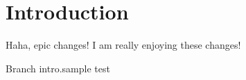 \chapter{Introduction}
Haha, epic changes! I am really enjoying these changes!

Branch intro.sample test